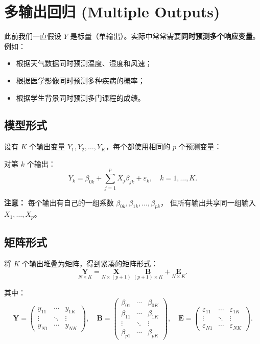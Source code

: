\section{多输出回归 (Multiple Outputs)}

此前我们一直假设 $Y$ 是标量（单输出）。实际中常常需要\textbf{同时预测多个响应变量}。
例如：
\begin{itemize}
    \item 根据天气数据同时预测温度、湿度和风速；
    \item 根据医学影像同时预测多种疾病的概率；
    \item 根据学生背景同时预测多门课程的成绩。
\end{itemize}

\subsection{模型形式}

设有 $K$ 个输出变量 $Y_1, Y_2, \dots, Y_K$，每个都使用相同的 $p$ 个预测变量：

\begin{definition}[多输出线性模型]
对第 $k$ 个输出：
\[
    Y_k = \beta_{0k} + \sum_{j=1}^{p} X_j \beta_{jk} + \varepsilon_k,
    \quad k = 1, \dots, K.
\]
\end{definition}

\textbf{注意：} 每个输出有自己的一组系数 $\beta_{0k}, \beta_{1k}, \dots, \beta_{pk}$，
但所有输出共享同一组输入 $X_1, \dots, X_p$。

\subsection{矩阵形式}

将 $K$ 个输出堆叠为矩阵，得到紧凑的矩阵形式：
\begin{equation}\label{eq:multi_Y}
    \underset{N \times K}{\mathbf{Y}}
    = \underset{N \times (p+1)}{\mathbf{X}} \;
      \underset{(p+1) \times K}{\mathbf{B}}
    + \underset{N \times K}{\mathbf{E}}.
\end{equation}

其中：
\[
    \mathbf{Y} = \begin{pmatrix}
        y_{11} & \cdots & y_{1K} \\
        \vdots & \ddots & \vdots \\
        y_{N1} & \cdots & y_{NK}
    \end{pmatrix},
    \quad
    \mathbf{B} = \begin{pmatrix}
        \beta_{01} & \cdots & \beta_{0K} \\
        \beta_{11} & \cdots & \beta_{1K} \\
        \vdots     & \ddots & \vdots \\
        \beta_{p1} & \cdots & \beta_{pK}
    \end{pmatrix},
    \quad
    \mathbf{E} = \begin{pmatrix}
        \varepsilon_{11} & \cdots & \varepsilon_{1K} \\
        \vdots           & \ddots & \vdots \\
        \varepsilon_{N1} & \cdots & \varepsilon_{NK}
    \end{pmatrix}.
\]


